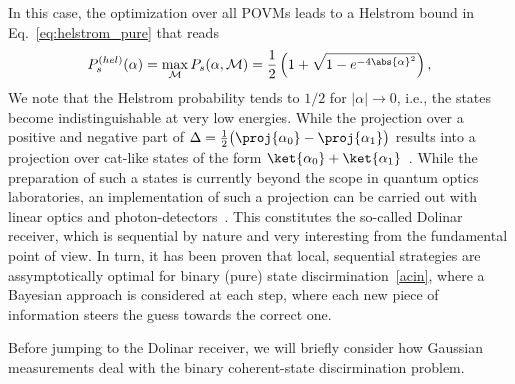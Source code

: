 In this case, the optimization over all POVMs leads to a Helstrom bound in Eq.~\ref{eq:helstrom_pure} that reads
\begin{align}\label{eq:hel_coh}
P_{s}^{(hel)}(\alpha)=\max_{\mathcal{M}}P_{s}(\alpha,\mathcal{M})=\frac12\left(1+\sqrt{1-e^{-4\abs{\alpha}^{2}}}\right),
\end{align}
We note that the Helstrom probability tends to $1/2$ for $|\alpha|\rightarrow0$, i.e., the states become indistinguishable at very low energies. While the projection over a positive and negative part of $\Delta = \frac{1}{2}\big(\proj{\alpha_0}-\proj{\alpha_1}\big)$ results into a projection over cat-like states of the form $\ket{\alpha_0} + \ket{\alpha_1}$~\cite{jap_cat}. While the preparation of such a states is currently beyond the scope in quantum optics laboratories, an implementation of such a projection can be carried out with linear optics and photon-detectors~\cite{takeoka, dolinar}. This constitutes the so-called Dolinar receiver, which is sequential by nature and very interesting from the fundamental point of view. In turn, it has been proven that local, sequential strategies are assymptotically optimal for binary (pure) state discirmination~\ref{acin}, where a Bayesian approach is considered at each step, where each new piece of information steers the guess towards the correct one.

%
%




Before jumping to the Dolinar receiver, we will briefly consider how Gaussian measurements deal with the binary coherent-state discirmination problem.
